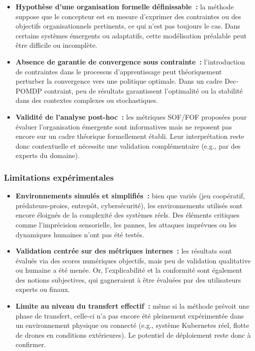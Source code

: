 \begin{itemize}
    \item \textbf{Hypothèse d’une organisation formelle définissable~:} la méthode suppose que le concepteur est en mesure d’exprimer des contraintes ou des objectifs organisationnels pertinents, ce qui n’est pas toujours le cas. Dans certains systèmes émergents ou adaptatifs, cette modélisation préalable peut être difficile ou incomplète.

    \item \textbf{Absence de garantie de convergence sous contrainte~:} l’introduction de contraintes dans le processus d’apprentissage peut théoriquement perturber la convergence vers une politique optimale. Dans un cadre Dec-POMDP contraint, peu de résultats garantissent l’optimalité ou la stabilité dans des contextes complexes ou stochastiques.

    \item \textbf{Validité de l’analyse post-hoc~:} les métriques SOF/FOF proposées pour évaluer l’organisation émergente sont informatives mais ne reposent pas encore sur un cadre théorique formellement établi. Leur interprétation reste donc contextuelle et nécessite une validation complémentaire (e.g., par des experts du domaine).
\end{itemize}

\subsubsection*{Limitations expérimentales}

\begin{itemize}
    \item \textbf{Environnements simulés et simplifiés~:} bien que variés (jeu coopératif, prédateurs-proies, entrepôt, cybersécurité), les environnements utilisés sont encore éloignés de la complexité des systèmes réels. Des éléments critiques comme l’imprécision sensorielle, les pannes, les attaques imprévues ou les dynamiques humaines n’ont pas été testés.

    \item \textbf{Validation centrée sur des métriques internes~:} les résultats sont évalués via des scores numériques objectifs, mais peu de validation qualitative ou humaine a été menée. Or, l’explicabilité et la conformité sont également des notions subjectives, qui gagneraient à être évaluées par des utilisateurs experts ou finaux.

    \item \textbf{Limite au niveau du transfert effectif~:} même si la méthode prévoit une phase de transfert, celle-ci n’a pas encore été pleinement expérimentée dans un environnement physique ou connecté (e.g., système Kubernetes réel, flotte de drones en conditions extérieures). Le potentiel de déploiement reste donc à confirmer.
\end{itemize}

